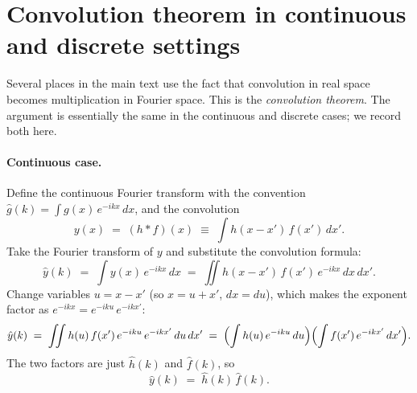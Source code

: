 \documentclass[12pt]{article}
\begin{document}
\appendix

\section{Convolution theorem in continuous and discrete settings}\label{app:convthm}

Several places in the main text use the fact that convolution in real
space becomes multiplication in Fourier space. This is the
\emph{convolution theorem}. The argument is essentially the same in
the continuous and discrete cases; we record both here.

\paragraph{Continuous case.}
Define the continuous Fourier transform with the convention
$\hat g(k) = \int g(x)\,e^{-ikx}\,dx$, and the convolution
\begin{equation}
  y(x) \;=\; (h*f)(x) \;\equiv\; \int h(x-x')\,f(x')\,dx'.
\end{equation}
Take the Fourier transform of $y$ and substitute the convolution
formula:
\begin{equation}
  \hat y(k) \;=\; \int y(x)\,e^{-ikx}\,dx
            \;=\; \iint h(x-x')\,f(x')\,e^{-ikx}\,dx\,dx'.
\end{equation}
Change variables $u = x-x'$ (so $x = u+x'$, $dx = du$), which makes
the exponent factor as $e^{-ikx} = e^{-iku}\,e^{-ikx'}$:
\begin{equation}
  \hat y(k) \;=\; \iint h(u)\,f(x')\,e^{-iku}\,e^{-ikx'}\,du\,dx'
            \;=\; \Bigl(\int h(u)\,e^{-iku}\,du\Bigr)
                  \Bigl(\int f(x')\,e^{-ikx'}\,dx'\Bigr).
\end{equation}
The two factors are just $\hat h(k)$ and $\hat f(k)$, so
\begin{equation}\label{eq:convthm-cont}
  \boxed{\;\hat y(k) \;=\; \hat h(k)\,\hat f(k).\;}
\end{equation}
\end{document}

